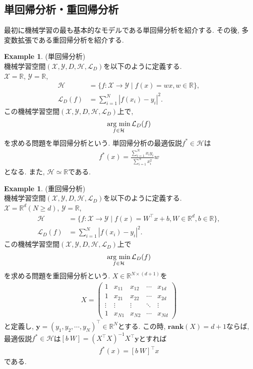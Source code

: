 \documentclass[11pt, a4paper, dvipdfmx]{jsarticle}
\theoremstyle{definition}
\newtheorem{Example+}[Axiom+]{Example}
\newcommand{\R}{\mathbb{R}}
\newcommand{\X}{\mathcal{X}}
\newcommand{\Y}{\mathcal{Y}}
\newcommand{\Hil}{\mathcal{H}}
\newcommand{\Loss}{\mathcal{L}_{D}}
\newcommand{\MLsp}{(\X, \Y, D, \Hil, \Loss)}
\newcommand{\argmin}{\mathop{\rm arg~min}\limits}
\begin{document}
\subsection{単回帰分析・重回帰分析}
最初に機械学習の最も基本的なモデルである単回帰分析を紹介する. その後, 
多変数拡張である重回帰分析を紹介する.
\begin{Example+}(単回帰分析)\\
    機械学習空間$\MLsp$を以下のように定義する.\\
    $\X = \R$, $\Y = \R$, 
    \begin{align*}
        \Hil &= \{f:\X\to\Y\mid f(x) = wx, w\in\R\},\\
        \Loss(f) &= \sum_{i = 1}^{N}|f(x_i) - y_i|^2.
    \end{align*}
    この機械学習空間$\MLsp$上で,
    \begin{align*}
        \argmin_{f\in\Hil}\Loss(f)
    \end{align*}
    を求める問題を単回帰分析という. 単回帰分析の最適仮説$f^{*}\in\Hil$は
    \begin{align*}
        f^{*}(x) = \frac{\sum_{i = 1}^{N}x_{i}y_{i}}{\sum_{i = 1}^{N}x_{i}^2}w
    \end{align*}
    となる. また, $\Hil\simeq\R$である.
\end{Example+}
\begin{Example+}(重回帰分析)\\
    機械学習空間$\MLsp$を以下のように定義する.\\
    $\X = \R^d(N\geq d)$, $\Y = \R$, 
    \begin{align*}
        \Hil &= \{f:\X\to\Y\mid f(x) = W^{\top}x + b, W\in\R^{d}, b\in\R\},\\
        \Loss(f) &= \sum_{i = 1}^{N}|f(x_i) - y_i|^2.
    \end{align*}
    この機械学習空間$\MLsp$上で
    \begin{align*}
        \argmin_{f\in\Hil}\Loss(f)
    \end{align*}
    を求める問題を重回帰分析という. $X\in\R^{N\times(d + 1)}$を
    \begin{align*}
        X = \begin{pmatrix}
            1 & x_{11} & x_{12} & \cdots & x_{1d}\\
            1 & x_{21} & x_{22} & \cdots & x_{2d}\\
            \vdots & \vdots & \vdots & \ddots & \vdots\\
            1 & x_{N1} & x_{N2} & \cdots & x_{Nd}
        \end{pmatrix}
    \end{align*}
    と定義し, $\mathbf{y} = (y_{1}, y_{2}, \cdots, y_{N})^{\top}\in\R^{N}$とする. この時, $\mathbf{rank}(X) = d + 1$ならば, 
    最適仮説$f^*\in\Hil$は$[b~W] = (X^\top X)^{-1}X^\top\mathbf{y}$とすれば
    \begin{align*}
        f^{*}(x) = [b~W]^{\top}x
    \end{align*}
    である.
\end{Example+}
\end{document}
